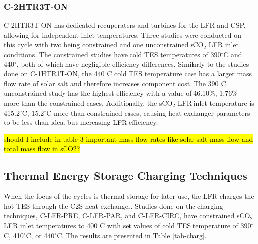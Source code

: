 \begin{paracol}{2}
\subsubsection{C-2HTR3T-ON}
C-2HTR3T-ON has dedicated recuperators and turbines for the LFR and CSP, allowing for independent inlet temperatures. Three studies were conducted on this cycle with two being constrained and one unconstrained sCO$_2$ LFR inlet conditions. The constrained studies have cold TES temperatures of 390$^{\circ}$C and 440$^{\circ}$, both of which have negligible efficiency differences. Similarly to the studies done on C-1HTR1T-ON, the 440$^{\circ}$C cold TES temperature case has a larger mass flow rate of solar salt and therefore increases component cost. The 390$^{\circ}$C unconstrained study has the highest efficiency with a value of 46.10\%, 1.76\% more than the constrained cases. Additionally, the sCO$_2$ LFR inlet temperature is 415.2$^{\circ}$C, 15.2$^{\circ}$C more than constrained cases, causing heat exchanger parameters to be less than ideal but increasing LFR efficiency. 

\hl{should I include in table 3 important mass flow rates like solar salt mass flow and total mass flow in sCO2?}

\subsection{Thermal Energy Storage Charging Techniques}

When the focus of the cycles is thermal storage for later use, the LFR charges the hot TES through the C2S heat exchanger. Studies done on the charging techniques, C-LFR-PRE, C-LFR-PAR, and C-LFR-CIRC, have constrained sCO$_2$ LFR inlet temperatures to 400$^{\circ}$C with set values of cold TES temperature of 390$^{\circ}$C, 410$^{\circ}$C, or 440$^{\circ}$C. The results are presented in Table \ref{tab-charg}. 

\end{paracol}
